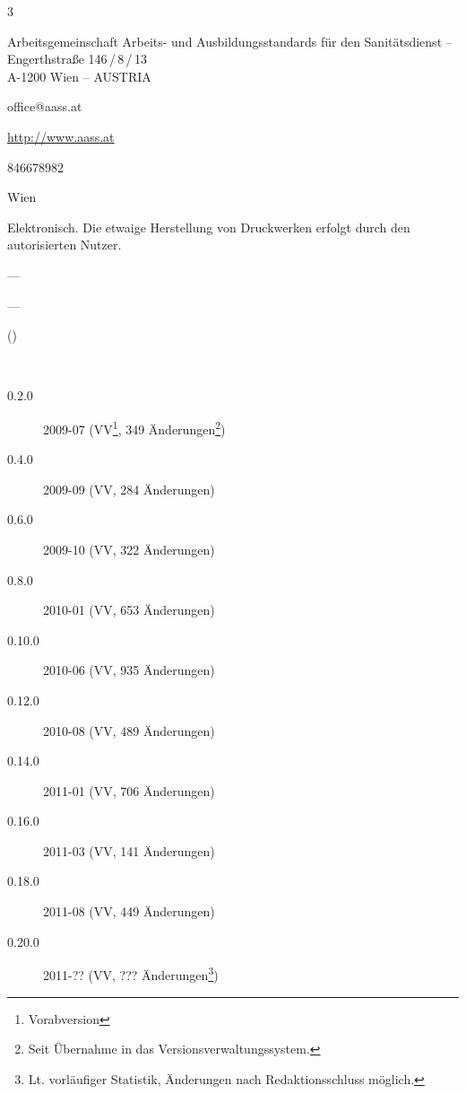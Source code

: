 \documentclass[
ngerman,
paper=a4,
asymmetric,
fontsize=9pt,
draft=false,
parskip=half,
bibtotocnumbered,
footnotes=multiple,
toc=flat,
]{scrbook}
\begin{document}
\begin{WidePar}

\begin{multicols}{3}

{\noindent\sffamily Arbeitsgemeinschaft Arbeits- und Ausbildungsstandards für
den Sanitätsdienst -- }{\ARGEAASS}
\\
\noindent{}Engerthstraße 146\,/\,8\,/\,13 \\
A-1200 Wien -- AUSTRIA

\begin{compactdesc}
  \item[E-Mail:] office@aass.at
  \item[Homepage:] \url{http://www.aass.at}
  \item[ZVR:] 846678982
\end{compactdesc}



\begin{compactdesc}
  \item[Verlags- und Herstellungsort:] Wien
  \item[Publikationsart:] Elektronisch. Die etwaige Herstellung von
  Druckwerken erfolgt durch den autorisierten Nutzer.
  \item[ISBN:] ---
  \item[ISSN:] ---
  \item[Status:] \DocVersionTyp{} (\DocVersionInfo{})
  \item[Versionsgeschichte:]~
  
  {\scriptsize %
  \begin{description}
    \item[0.2.0] 2009-07 (VV\footnote{Vorabversion}, 349 Änderungen\footnote{Seit
    Übernahme in das Versionsverwaltungssystem.})
    \item[0.4.0] 2009-09 (VV, 284 Änderungen)
    \item[0.6.0] 2009-10 (VV, 322 Änderungen)
    \item[0.8.0] 2010-01 (VV, 653 Änderungen)
    \item[0.10.0] 2010-06 (VV, 935 Änderungen)
    \item[0.12.0] 2010-08 (VV, 489 Änderungen)
    \item[0.14.0] 2011-01 (VV, 706 Änderungen)
    \item[0.16.0] 2011-03 (VV, 141 Änderungen)
    \item[0.18.0] 2011-08 (VV, 449 Änderungen)
    \item[0.20.0] 2011-?? (VV, ??? Änderungen\footnote{Lt.
    vorläufiger Statistik, Änderungen nach Redaktionsschluss möglich.})
  \end{description}
  }
\end{compactdesc}


\end{multicols}
\end{WidePar}
\end{document}
